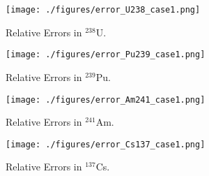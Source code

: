 \documentclass{anstrans}
\begin{document}
\begin{figure}[!htb] 
  \centering
  \texttt{[image: ./figures/error\_U238\_case1.png]}
  \caption{Relative Errors in ${}^{238}$U.}
  \label{u238_err1}
\end{figure}
\begin{figure}[!htb] 
  \centering
  \texttt{[image: ./figures/error\_Pu239\_case1.png]}
  \caption{Relative Errors in ${}^{239}$Pu.}
  \label{pu239_err1}
  \end{figure}
  \begin{figure}[!htb] 
  \centering
  \texttt{[image: ./figures/error\_Am241\_case1.png]}
  \caption{Relative Errors in ${}^{241}$Am.}
  \label{Am241_err1}
\end{figure}
\begin{figure}[!htb] 
  \centering
  \texttt{[image: ./figures/error\_Cs137\_case1.png]}
  \caption{Relative Errors in ${}^{137}$Cs.}
  \label{Cs137_err1}
\end{figure}
\end{document}
